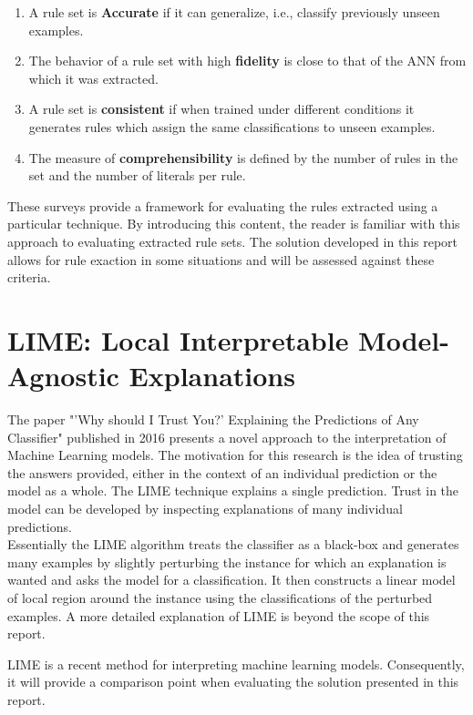 \begin{enumerate}
\item A rule set is \textbf{Accurate} if it can generalize, i.e., classify previously unseen examples.
\item The behavior of a rule set with high \textbf{fidelity} is close to that of the ANN from which it was extracted.
\item A rule set is \textbf{consistent} if when trained under different conditions it generates rules which assign the same classifications to unseen examples.
\item The measure of \textbf{comprehensibility} is defined by the number of rules in the set and the number of literals per rule.
\end{enumerate}

These surveys provide a framework for evaluating the rules extracted using a particular technique. By introducing this content, the reader is familiar with this approach to evaluating extracted rule sets. The solution developed in this report allows for rule exaction in some situations and will be assessed against these criteria. 

\section{LIME: Local Interpretable Model-Agnostic Explanations}
The paper "'Why should I Trust You?' Explaining the Predictions of Any Classifier" \cite{ribeiro2016should} published in 2016 presents a novel approach to the interpretation of Machine Learning models. The motivation for this research is the idea of trusting the answers provided, either in the context of an individual prediction or the model as a whole. The LIME technique explains  a single prediction. Trust in the model can be developed by inspecting explanations of many individual predictions.\\

Essentially the LIME algorithm treats the classifier as a black-box and generates many examples by slightly perturbing the instance for which an explanation is wanted and asks the model for a classification. It then constructs a linear model of local region around the instance using the classifications of the perturbed examples. A more detailed explanation of LIME is beyond the scope of this report.

LIME is a recent method for interpreting machine learning models. Consequently, it will provide a comparison point when evaluating the solution presented in this report.

